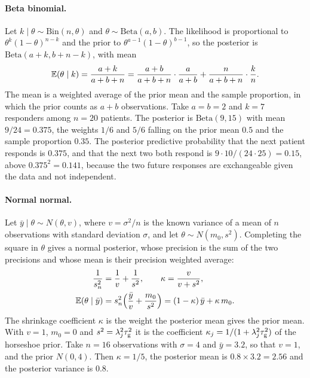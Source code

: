\paragraph{Beta binomial.} Let $k \mid \theta \sim \mathrm{Bin}(n, \theta)$ and $\theta \sim \mathrm{Beta}(a, b)$. The likelihood is proportional to $\theta^k(1 - \theta)^{n-k}$ and the prior to $\theta^{a-1}(1 - \theta)^{b-1}$, so the posterior is $\mathrm{Beta}(a + k, b + n - k)$, with mean
\[
\mathbb{E}(\theta \mid k) = \frac{a + k}{a + b + n} = \frac{a + b}{a + b + n}\cdot\frac{a}{a + b} + \frac{n}{a + b + n}\cdot\frac{k}{n}.
\]
The mean is a weighted average of the prior mean and the sample proportion, in which the prior counts as $a + b$ observations. Take $a = b = 2$ and $k = 7$ responders among $n = 20$ patients. The posterior is $\mathrm{Beta}(9, 15)$ with mean $9/24 = 0.375$, the weights $1/6$ and $5/6$ falling on the prior mean $0.5$ and the sample proportion $0.35$. The posterior predictive probability that the next patient responds is $0.375$, and that the next two both respond is $9 \cdot 10/(24 \cdot 25) = 0.15$, above $0.375^2 = 0.141$, because the two future responses are exchangeable given the data and not independent.

\paragraph{Normal normal.} Let $\bar y \mid \theta \sim N(\theta, v)$, where $v = \sigma^2/n$ is the known variance of a mean of $n$ observations with standard deviation $\sigma$, and let $\theta \sim N(m_0, s^2)$. Completing the square in $\theta$ gives a normal posterior, whose precision is the sum of the two precisions and whose mean is their precision weighted average:
\begin{align*}
\frac{1}{s_n^2} &= \frac{1}{v} + \frac{1}{s^2}, \qquad \kappa = \frac{v}{v + s^2}, \\
\mathbb{E}(\theta \mid \bar y) &= s_n^2\Bigl(\frac{\bar y}{v} + \frac{m_0}{s^2}\Bigr) = (1 - \kappa)\,\bar y + \kappa\,m_0.
\end{align*}
The shrinkage coefficient $\kappa$ is the weight the posterior mean gives the prior mean. With $v = 1$, $m_0 = 0$ and $s^2 = \lambda_j^2\tau_{\mathrm{g}}^2$ it is the coefficient $\kappa_j = 1/(1 + \lambda_j^2\tau_{\mathrm{g}}^2)$ of the horseshoe prior. Take $n = 16$ observations with $\sigma = 4$ and $\bar y = 3.2$, so that $v = 1$, and the prior $N(0, 4)$. Then $\kappa = 1/5$, the posterior mean is $0.8 \times 3.2 = 2.56$ and the posterior variance is $0.8$. 


